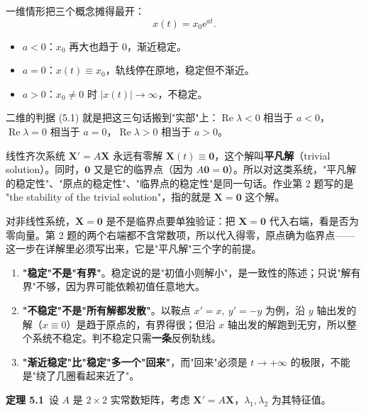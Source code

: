 \documentclass[11pt]{ctexart}
\newcommand{\X}{\mathbf{X}}\newcommand{\Y}{\mathbf{Y}}
\newcommand{\abs}[1]{\left|#1\right|}
\begin{document}

一维情形把三个概念摊得最开：
\[
x(t)=x_0\mathrm{e}^{at}.
\]
\begin{itemize}
\item $a<0$：$x_0$ 再大也趋于 $0$，渐近稳定。
\item $a=0$：$x(t)\equiv x_0$，轨线停在原地，稳定但不渐近。
\item $a>0$：$x_0\neq0$ 时 $\abs{x(t)}\to\infty$，不稳定。
\end{itemize}
二维的判据 (5.1) 就是把这三句话搬到"实部"上：$\operatorname{Re}\lambda<0$ 相当于 $a<0$，$\operatorname{Re}\lambda=0$ 相当于 $a=0$，$\operatorname{Re}\lambda>0$ 相当于 $a>0$。


线性齐次系统 $\X'=A\X$ 永远有零解 $\X(t)\equiv\mathbf{0}$，这个解叫\textbf{平凡解}（trivial solution）。同时，$\mathbf{0}$ 又是它的临界点（因为 $A\mathbf{0}=\mathbf{0}$）。所以对这类系统，"平凡解的稳定性"、"原点的稳定性"、"临界点的稳定性"是同一句话。作业第 2 题写的是 "the stability of the trivial solution"，指的就是 $\X=\mathbf{0}$ 这个解。

对非线性系统，$\X=\mathbf{0}$ 是不是临界点要单独验证：把 $\X=\mathbf{0}$ 代入右端，看是否为零向量。第 2 题的两个右端都不含常数项，所以代入得零，原点确为临界点——这一步在详解里必须写出来，它是"平凡解"三个字的前提。


\begin{enumerate}
\item \textbf{"稳定"不是"有界"}。稳定说的是"初值小则解小"，是一致性的陈述；只说"解有界"不够，因为界可能依赖初值任意地大。
\item \textbf{"不稳定"不是"所有解都发散"}。以鞍点 $x'=x,\ y'=-y$ 为例，沿 $y$ 轴出发的解（$x\equiv0$）是趋于原点的，有界得很；但沿 $x$ 轴出发的解跑到无穷，所以整个系统不稳定。判不稳定只需\textbf{一条}反例轨线。
\item \textbf{"渐近稳定"比"稳定"多一个"回来"}，而"回来"必须是 $t\to+\infty$ 的极限，不能是"绕了几圈看起来近了"。
\end{enumerate}



\textbf{定理 5.1}\ 设 $A$ 是 $2\times2$ 实常数矩阵，考虑 $\X'=A\X$，$\lambda_1,\lambda_2$ 为其特征值。
\end{document}

